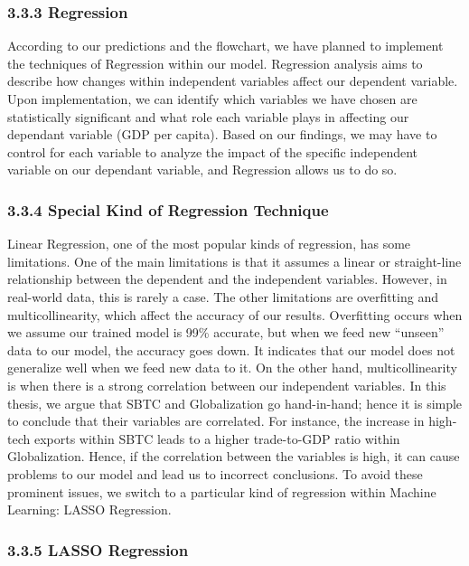 \documentclass[12pt,oneside]{book} %
\begin{document}
\subsubsection{3.3.3 Regression}

According to our predictions and the flowchart, we have planned to implement the techniques of Regression within our model. Regression analysis aims to describe how changes within independent variables affect our dependent variable. Upon implementation, we can identify which variables we have chosen are statistically significant and what role each variable plays in affecting our dependant variable (GDP per capita). Based on our findings, we may have to control for each variable to analyze the impact of the specific independent variable on our dependant variable, and Regression allows us to do so.

\subsubsection{3.3.4 Special Kind of Regression Technique}

\hspace{20pt}Linear Regression, one of the most popular kinds of regression, has some limitations. One of the main limitations is that it assumes a linear or straight-line relationship between the dependent and the independent variables. However, in real-world data, this is rarely a case. The other limitations are overfitting and multicollinearity, which affect the accuracy of our results. Overfitting occurs when we assume our trained model is 99\% accurate, but when we feed new “unseen” data to our model, the accuracy goes down. It indicates that our model does not generalize well when we feed new data to it. On the other hand, multicollinearity is when there is a strong correlation between our independent variables. In this thesis, we argue that SBTC and Globalization go hand-in-hand; hence it is simple to conclude that their variables are correlated. For instance, the increase in high-tech exports within SBTC leads to a higher trade-to-GDP ratio within Globalization. Hence, if the correlation between the variables is high, it can cause problems to our model and lead us to incorrect conclusions. To avoid these prominent issues, we switch to a particular kind of regression within Machine Learning: LASSO Regression.

\subsubsection{3.3.5 LASSO Regression}
\end{document}
